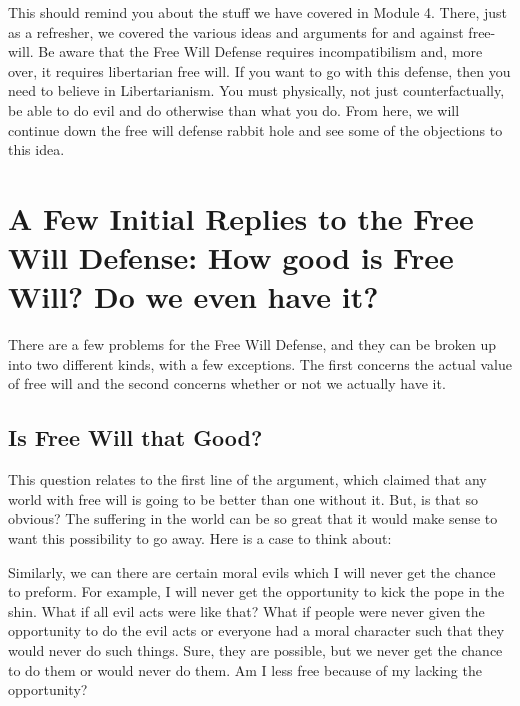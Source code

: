 This should remind you about the stuff we have covered in Module 4. There, just as a refresher, we covered the various ideas and arguments for and against free-will. Be aware that the Free Will Defense requires incompatibilism and, more over, it requires libertarian free will. If you want to go with this defense, then you need to believe in Libertarianism. You must physically, not just counterfactually, be able to do evil and do otherwise than what you do.  From here, we will continue down the free will defense rabbit hole and see some of the objections to this idea.
\section{A Few Initial Replies to the Free Will Defense: How good is Free Will? Do we even have it?}

There are a few problems for the Free Will Defense, and they can be broken up into two different kinds, with a few exceptions. The first concerns the actual value of free will and the second concerns whether or not we actually have it. 
\subsection{Is Free Will that Good?}

This question relates to the first line of the argument, which claimed that any world with free will is going to be better than one without it. But, is that so obvious? The suffering in the world can be so great that it would make sense to want this possibility to go away. Here is a case to think about:


Similarly, we can there are certain moral evils which I will never get the chance to preform. For example, I will never get the opportunity to kick the pope in the shin. What if all evil acts were like that? What if people were never given the opportunity to do the evil acts or everyone had a moral character such that they would never do such things. Sure, they are possible, but we never get the chance to do them or would never do them. Am I less free because of my lacking the opportunity?
